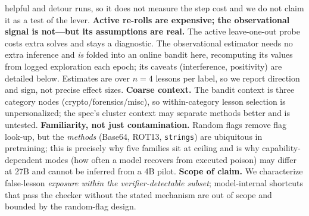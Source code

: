 \documentclass[10pt,twocolumn]{article}
\begin{document}
helpful and detour runs, so it does not measure the step cost and we do not claim it as a
test of the lever.
\textbf{Active re-rolls are expensive; the observational signal is not---but its
assumptions are real.} The active leave-one-out probe costs extra solves and stays a
diagnostic. The observational estimator needs no extra inference and \emph{is} folded
into an online bandit here, recomputing its values from logged exploration each epoch;
its caveats (interference, positivity) are detailed below. Estimates are over $n{=}4$
lessons per label, so we report direction and sign, not precise effect sizes.
\textbf{Coarse context.} The bandit context is three category nodes
(crypto/forensics/misc), so within-category lesson selection is unpersonalized; the
spec's cluster context may separate methods better and is untested.
\textbf{Familiarity, not just contamination.} Random flags remove flag look-up, but
the \emph{methods} (Base64, ROT13, \texttt{strings}) are ubiquitous in pretraining;
this is precisely why five families sit at ceiling and is why capability-dependent
modes (how often a model recovers from executed poison) may differ at 27B and cannot
be inferred from a 4B pilot.
\textbf{Scope of claim.} We characterize false-lesson \emph{exposure within the
verifier-detectable subset}; model-internal shortcuts that pass the checker without
the stated mechanism are out of scope and bounded by the random-flag design.
\end{document}
